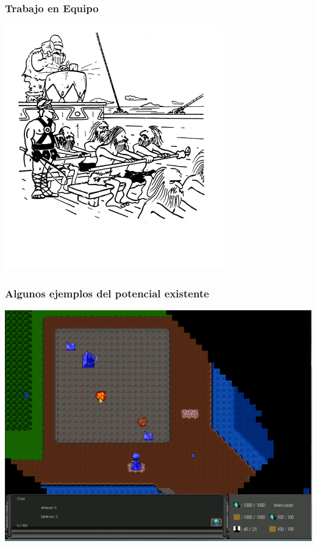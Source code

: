 
\begin{frame}
	\frametitle{Trabajo en Equipo}
	
	\begin{center}
		\includegraphics[scale=0.70]{img/equipo.jpg}
	\end{center}

\end{frame}


\begin{frame}
	\frametitle{Algunos ejemplos del potencial existente}
	
	\begin{center}
		\includegraphics[scale=0.25]{img/laboon.png}
	\end{center}

\end{frame}

